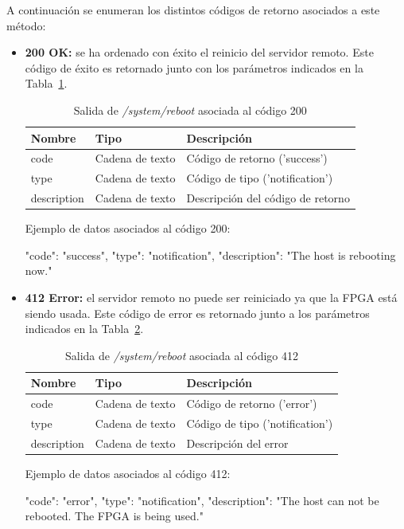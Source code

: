 A continuación se enumeran los distintos códigos de retorno asociados a este método:
\begin{itemize}

\item{\textbf{200 OK:} se ha ordenado con éxito el reinicio del servidor remoto.
Este código de éxito es retornado junto con los parámetros indicados en la Tabla~\ref{extra:api:reboot:ok}.
\begin{table}[H]
\centering
\begin{tabular}{|l|l|l|}
\hline
\rowcolor[HTML]{F5F5F5}
\textbf{Nombre}  & \textbf{Tipo}   & \textbf{Descripción}              \\ \hline
code             & Cadena de texto & Código de retorno ('success')     \\ \hline
type             & Cadena de texto & Código de tipo ('notification')   \\ \hline
description      & Cadena de texto & Descripción del código de retorno \\ \hline
\end{tabular}
\caption{Salida de \textit{/system/reboot} asociada al código 200}
\label{extra:api:reboot:ok}
\end{table}
\begin{minipage}{\textwidth}
Ejemplo de datos asociados al código 200:

\begin{code}[language=json]
{
  "code": "success",
  "type": "notification",
  "description": "The host is rebooting now."
}
\end{code}
\end{minipage}
}

\item{\textbf{412 Error:} el servidor remoto no puede ser reiniciado ya que la \gls{FPGA} está siendo usada.
Este código de error es retornado junto a los parámetros indicados en la Tabla~\ref{extra:api:reboot:error}.
\begin{table}[H]
\centering
\begin{tabular}{|l|l|l|}
\hline
\rowcolor[HTML]{F5F5F5}
\textbf{Nombre}  & \textbf{Tipo}   & \textbf{Descripción}            \\ \hline
code             & Cadena de texto & Código de retorno ('error')     \\ \hline
type             & Cadena de texto & Código de tipo ('notification') \\ \hline
description      & Cadena de texto & Descripción del error           \\ \hline
\end{tabular}
\caption{Salida de \textit{/system/reboot} asociada al código 412}
\label{extra:api:reboot:error}
\end{table}
\begin{minipage}{\textwidth}
Ejemplo de datos asociados al código 412:

\begin{code}[language=json]
{
  "code": "error",
  "type": "notification",
  "description": "The host can not be rebooted. The FPGA is being used."
}
\end{code}
\end{minipage}
}
\end{itemize}

